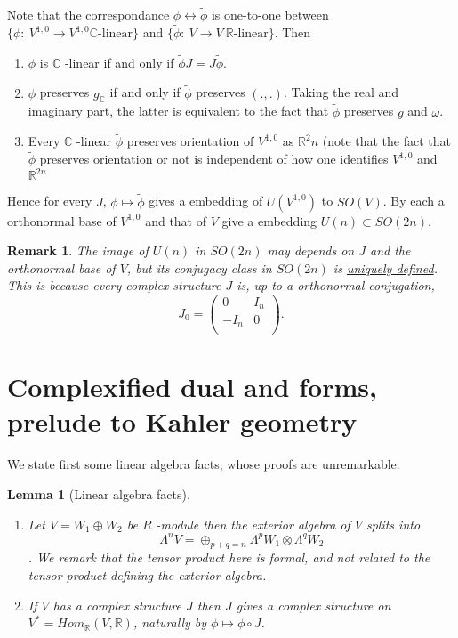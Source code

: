 \documentclass[11pt]{article}
\newtheorem{remark}{Remark}
\newtheorem{lemma}[theorem]{Lemma}
\begin{document}
Note that the correspondance \(\phi \leftrightarrow \tilde\phi\) is one-to-one between \(\{\phi:\
V^{1,0}\longrightarrow V^{1,0} \mathbb{C}\text{-linear}\}\) and \(\{\tilde\phi:\ V\longrightarrow V\
\mathbb{R}\text{-linear}\}\). Then
\begin{enumerate}
\item \(\phi\) is \(\mathbb{C}\) -linear if and only if \(\tilde\phi J = J\tilde\phi\).
\item \(\phi\) preserves \(g_{\mathbb{C}}\) if and only if \(\tilde\phi\) preserves \((.,.)\). Taking the real
and imaginary part, the latter is equivalent to the fact that \(\tilde\phi\) preserves \(g\) and
\(\omega\).
\item Every \(\mathbb{C}\) -linear \(\tilde \phi\) preserves orientation of \(V^{1,0}\) as \(\mathbb{R}^2n\)
(note that the fact that \(\tilde\phi\) preserves orientation or not is independent of how one
identifies \(V^{1,0}\) and \(\mathbb{R}^{2n}\)
\end{enumerate}
Hence for every \(J\), \(\phi\mapsto\tilde\phi\) gives a embedding of \(U(V^{1,0})\) to \(SO(V)\). By each
a orthonormal base of \(V^{1,0}\) and that of \(V\) give a embedding \(U(n)\subset SO(2n)\).

\begin{remark}
The image of \(U(n)\) in \(SO(2n)\) may depends on \(J\) and the orthonormal base of \(V\), but its
conjugacy class in \(SO(2n)\) is \uline{uniquely defined}. This is because every complex structure \(J\) is,
up to a orthonormal conjugation, 
\[
J_0 = \begin{pmatrix}
0 & I_n \\
-I_n & 0 \\
\end{pmatrix}.
\]
\end{remark}


\section*{Complexified dual and forms, prelude to Kahler geometry}
\label{sec:orgb1082e5}

We state first some linear algebra facts, whose proofs are unremarkable.

\begin{lemma}[Linear algebra facts]
\label{lem:alg-exterior}
\label{org7fd0499}
\begin{enumerate}
\item Let \(V = W_1 \oplus W_2\) be \(R\) -module then the exterior algebra of \(V\) splits into \[\Lambda^nV
   = \oplus_{p+q = n}\Lambda^p W_1 \otimes \Lambda^q W_2 \]. We remark that the tensor product here
is formal, and not related to the tensor product defining the exterior algebra.
\item If \(V\) has a complex structure \(J\) then \(J\) gives a complex structure on \(V^* =
   Hom_{\mathbb{R}}(V, \mathbb{R})\), naturally by \(\phi\mapsto \phi\circ J\).
\end{enumerate}
\end{lemma}
\end{document}
